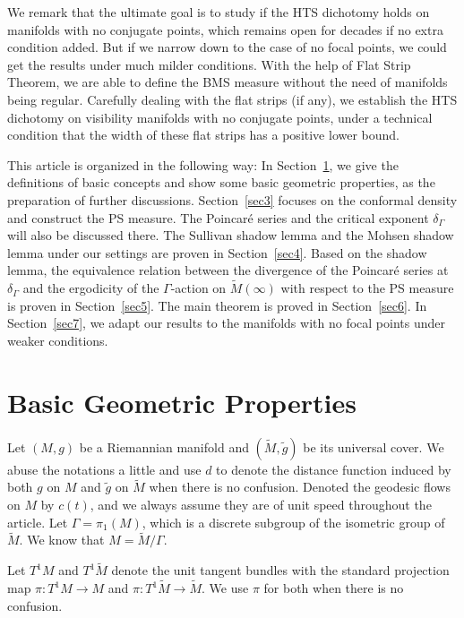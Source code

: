 \documentclass[reqno,11pt]{article}
\theoremstyle{definition}
\theoremstyle{remark}
\numberwithin{equation}{section}
\begin{document}
We remark that the ultimate goal is to study if the HTS dichotomy holds on manifolds with no conjugate points, which remains open for decades if no extra condition added. But if we narrow down to the case of no focal points, we could get the results under much milder conditions. With the help of Flat Strip Theorem, we are able to define the BMS measure without the need of manifolds being regular. Carefully dealing with the flat strips (if any), we establish the HTS dichotomy on visibility manifolds with no conjugate points, under a technical condition that the width of these flat strips has a positive lower bound. 

This article is organized in the following way: In Section~\ref{sec2}, we give the definitions of basic concepts and show some basic geometric properties, as the preparation of further discussions. Section~\ref{sec3} focuses on the conformal density and construct the PS measure. The Poincar\'e series and the critical exponent $\delta_{\Gamma}$ will also be discussed there.  The Sullivan shadow lemma and the Mohsen shadow lemma under our settings are proven in Section~\ref{sec4}.  Based on the shadow lemma, the equivalence relation between the divergence of the Poincar\'e series at $\delta_{\Gamma}$ and the ergodicity of the $\Gamma$-action on $\widetilde{M}(\infty)$ with respect to the PS measure is proven in Section~\ref{sec5}. The main theorem is proved in Section~\ref{sec6}. In Section~\ref{sec7}, we adapt our results to the manifolds with no focal points under weaker conditions.

\section{\bf Basic Geometric Properties}\label{sec2}
Let $(M,g)$ be a Riemannian manifold and $(\widetilde{M},\widetilde{g})$ be its universal cover. We abuse the notations a little and use $d$ to denote the distance function induced by both $g$ on $M$ and $\widetilde{g}$ on $\widetilde{M}$ when there is no confusion. Denoted the geodesic flows on $M$ by $c(t)$, and we always assume they are of unit speed throughout the article. Let $\Gamma=\pi_1(M)$, which is a discrete subgroup of the isometric group of $\widetilde{M}$. We know that $M=\widetilde{M}/\Gamma$.

Let $T^1 M$ and $T^1\widetilde{M}$ denote the unit tangent bundles with the standard projection map $\pi: T^1M\to M$ and $\pi: T^1\widetilde{M}\to \widetilde{M}$. We use $\pi$ for both when there is no confusion.
\end{document}
